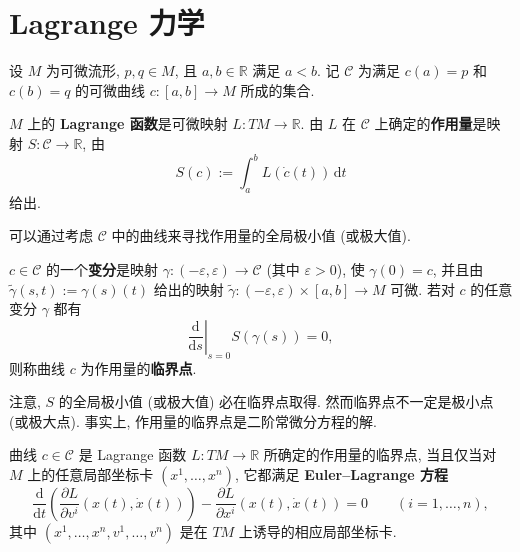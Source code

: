 \section{Lagrange 力学}\label{sec:lagrangian-mechanics}

设 $M$ 为可微流形, $p,q\in M$, 且 $a,b\in\mathbb{R}$ 满足 $a<b$. 记 $\mathcal{C}$ 为满足 $c(a)=p$ 和 $c(b)=q$ 的可微曲线 $c:[a,b]\to M$ 所成的集合.

\begin{RiemannDefinition}\label{def:lagrangian-and-action}
$M$ 上的 \textbf{Lagrange 函数}是可微映射 $L:TM\to\mathbb{R}$. 由 $L$ 在 $\mathcal{C}$ 上确定的\textbf{作用量}是映射 $S:\mathcal{C}\to\mathbb{R}$, 由
\[
  S(c):=\int_a^b L(\dot c(t))\,\mathrm{d}t
\]
给出.
\end{RiemannDefinition}

可以通过考虑 $\mathcal{C}$ 中的曲线来寻找作用量的全局极小值 (或极大值).

\begin{RiemannDefinition}\label{def:variation-and-critical-point-of-action}
$c\in\mathcal{C}$ 的一个\textbf{变分}是映射 $\gamma:(-\varepsilon,\varepsilon)\to\mathcal{C}$ (其中 $\varepsilon>0$), 使 $\gamma(0)=c$, 并且由 $\widetilde\gamma(s,t):=\gamma(s)(t)$ 给出的映射 $\widetilde\gamma:(-\varepsilon,\varepsilon)\times[a,b]\to M$ 可微. 若对 $c$ 的任意变分 $\gamma$ 都有
\[
  \left.\frac{\mathrm{d}}{\mathrm{d}s}\right|_{s=0}S(\gamma(s))=0,
\]
则称曲线 $c$ 为作用量的\textbf{临界点}.
\end{RiemannDefinition}

注意, $S$ 的全局极小值 (或极大值) 必在临界点取得. 然而临界点不一定是极小点 (或极大点). 事实上, 作用量的临界点是二阶常微分方程的解.

\begin{RiemannTheorem}\label{thm:euler-lagrange-equations}
曲线 $c\in\mathcal{C}$ 是 Lagrange 函数 $L:TM\to\mathbb{R}$ 所确定的作用量的临界点, 当且仅当对 $M$ 上的任意局部坐标卡 $(x^1,\ldots,x^n)$, 它都满足 \textbf{Euler–Lagrange 方程}
\[
  \frac{\mathrm{d}}{\mathrm{d}t}
  \left(\frac{\partial L}{\partial v^i}(x(t),\dot x(t))\right)
  -\frac{\partial L}{\partial x^i}(x(t),\dot x(t))=0
  \qquad(i=1,\ldots,n),
\]
其中 $(x^1,\ldots,x^n,v^1,\ldots,v^n)$ 是在 $TM$ 上诱导的相应局部坐标卡.
\end{RiemannTheorem}

